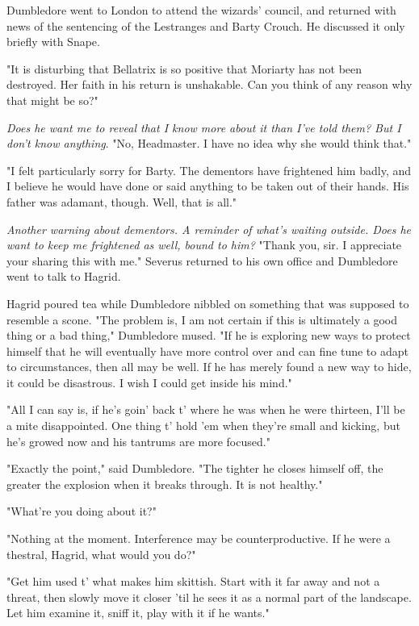 Dumbledore went to London to attend the wizards' council, and returned with news of the sentencing of the Lestranges and Barty Crouch. He discussed it only briefly with Snape.

"It is disturbing that Bellatrix is so positive that Moriarty has not been destroyed. Her faith in his return is unshakable. Can you think of any reason why that might be so?"

\emph{Does he want me to reveal that I know more about it than I've told them? But I don't know anything}. "No, Headmaster. I have no idea why she would think that."

"I felt particularly sorry for Barty. The dementors have frightened him badly, and I believe he would have done or said anything to be taken out of their hands. His father was adamant, though. Well, that is all."

\emph{Another warning about dementors. A reminder of what's waiting outside. Does he want to keep me frightened as well, bound to him?} "Thank you, sir. I appreciate your sharing this with me." Severus returned to his own office and Dumbledore went to talk to Hagrid.

Hagrid poured tea while Dumbledore nibbled on something that was supposed to resemble a scone. "The problem is, I am not certain if this is ultimately a good thing or a bad thing," Dumbledore mused. "If he is exploring new ways to protect himself that he will eventually have more control over and can fine tune to adapt to circumstances, then all may be well. If he has merely found a new way to hide, it could be disastrous. I wish I could get inside his mind."

"All I can say is, if he's goin' back t' where he was when he were thirteen, I'll be a mite disappointed. One thing t' hold 'em when they're small and kicking, but he's growed now and his tantrums are more focused."

"Exactly the point," said Dumbledore. "The tighter he closes himself off, the greater the explosion when it breaks through. It is not healthy."

"What're you doing about it?"

"Nothing at the moment. Interference may be counterproductive. If he were a thestral, Hagrid, what would you do?"

"Get him used t' what makes him skittish. Start with it far away and not a threat, then slowly move it closer 'til he sees it as a normal part of the landscape. Let him examine it, sniff it, play with it if he wants."


